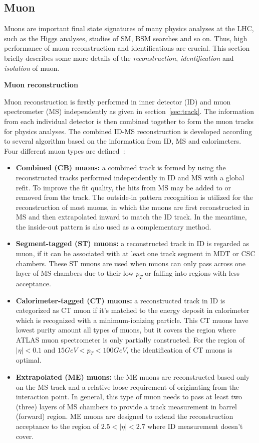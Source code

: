 \subsection{Muon}
\label{sec:muon}

Muons are important final state signatures of many physics analyses at the LHC, such as the Higgs analyses, studies of SM, BSM searches and so on. 
Thus, high performance of muon reconstruction and identifications are crucial.
This section briefly describes some more details of the \textit{reconstruction}, \textit{identification} and \textit{isolation} of muon.

\textbf{Muon reconstruction}

Muon reconstruction is firstly performed in inner detector (ID) and muon spectrometer (MS) independently as given in section~\ref{sec:track}.
The information from each individual detector is then combined together to form the muon tracks for physics analyses.
The combined ID-MS reconstruction is developed according to several algorithm based on the information from ID, MS and calorimeters.
Four different muon types are defined~\cite{Aad:2016jkr}:
\begin{itemize}
	\item \textbf{Combined (CB) muons:} a combined track is formed by using the reconstructed tracks performed independently in ID and MS with a global refit. To improve the fit quality, the hits from MS may be added to or removed from the track. The outside-in pattern recognition is utilized for the reconstruction of most muons, in which the muons are first reconstructed in MS and then extrapolated inward to match the ID track. In the meantime, the inside-out pattern is also used as a complementary method.
	\item \textbf{Segment-tagged (ST) muons:} a reconstructed track in ID is regarded as muon, if it can be associated with at least one track segment in MDT or CSC chambers. These ST muons are used when muons can only pass across one layer of MS chambers due to their low $p_{T}$ or falling into regions with less acceptance.
	\item \textbf{Calorimeter-tagged (CT) muons:} a reconstructed track in ID is categorized as CT muon if it's matched to the energy deposit in calorimeter which is recognized with a minimum-ionizing particle. This CT muons have lowest purity amount all types of muons, but it covers the region where ATLAS muon spectrometer is only partially constructed. For the region of $|\eta| < 0.1$ and $15 GeV < p_{T} < 100 GeV$, the identification of CT muons is optimal.
	\item \textbf{Extrapolated (ME) muons:} the ME muons are reconstructed based only on the MS track and a relative loose requirement of originating from the interaction point. In general, this type of muon needs to pass at least two (three) layers of MS chambers to provide a track measurement in barrel (forward) region. ME muons are designed to extend the reconstruction acceptance to the region of $2.5 < |\eta| < 2.7$ where ID measurement doesn't cover.
\end{itemize}

